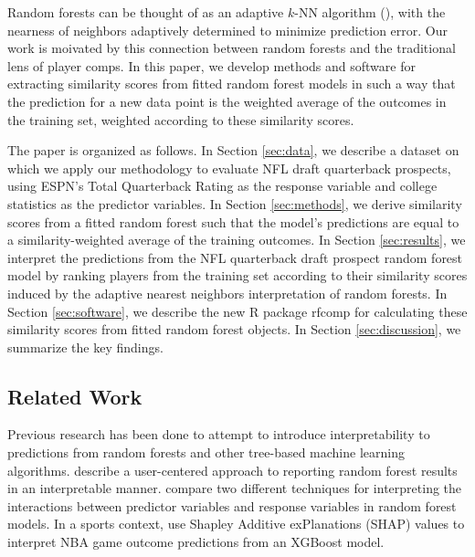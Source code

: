 \documentclass[Review, sageh, times]{sagej}
\begin{document}
Random forests can be thought of as an adaptive $k$-NN algorithm (\cite{lin_random_2006}), with the nearness of neighbors adaptively determined to minimize prediction error. Our work is moivated by this connection between random forests and the traditional lens of player comps. In this paper, we develop methods and software for extracting similarity scores from fitted random forest models in such a way that the prediction for a new data point is the weighted average of the outcomes in the training set, weighted according to these similarity scores.

The paper is organized as follows. In Section \ref{sec:data}, we describe a dataset on which we apply our methodology to evaluate NFL draft quarterback prospects, using ESPN's Total Quarterback Rating as the response variable and college statistics as the predictor variables. In Section \ref{sec:methods}, we derive similarity scores from a fitted random forest such that the model's predictions are equal to a similarity-weighted average of the training outcomes. In Section \ref{sec:results}, we interpret the predictions from the NFL quarterback draft prospect random forest model by ranking players from the training set according to their similarity scores induced by the adaptive nearest neighbors interpretation of random forests. In Section \ref{sec:software}, we describe the new R package rfcomp for calculating these similarity scores from fitted random forest objects. In Section \ref{sec:discussion}, we summarize the key findings.

\subsection{Related Work}
Previous research has been done to attempt to introduce interpretability to predictions from random forests and other tree-based machine learning algorithms. \textcite{petkovic_improving_2018} describe a user-centered approach to reporting random forest results in an interpretable manner. \textcite{aria_comparison_2021} compare two different techniques for interpreting the interactions between predictor variables and response variables in random forest models. In a sports context, \textcite{ouyang_integration_2024} use Shapley Additive exPlanations (SHAP) values to interpret NBA game outcome predictions from an XGBoost model.
\end{document}
